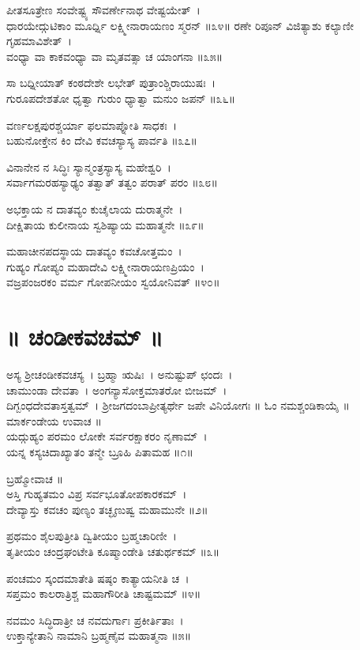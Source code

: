ಪೀತಸೂತ್ರೇಣ ಸಂವೇಷ್ಟ್ಯ ಸೌವರ್ಣೇನಾಥ ವೇಷ್ಟಯೇತ್~।\\
ಧಾರಯೇದ್ಗುಟಿಕಾಂ ಮೂರ್ಧ್ನಿ ಲಕ್ಷ್ಮೀನಾರಾಯಣಂ ಸ್ಮರನ್ ॥೩೪॥
\newpage
ರಣೇ ರಿಪೂನ್ ವಿಜಿತ್ಯಾಶು ಕಲ್ಯಾಣೀ ಗೃಹಮಾವಿಶೇತ್~।\\
ವಂಧ್ಯಾ ವಾ ಕಾಕವಂಧ್ಯಾ ವಾ ಮೃತವತ್ಸಾ ಚ ಯಾಂಗನಾ ॥೩೫॥

ಸಾ ಬಧ್ನೀಯಾತ್ ಕಂಠದೇಶೇ ಲಭೇತ್ ಪುತ್ರಾಂಶ್ಚಿರಾಯುಷಃ~।\\
ಗುರೂಪದೇಶತೋ ಧೃತ್ವಾ ಗುರುಂ ಧ್ಯಾತ್ವಾ ಮನುಂ ಜಪನ್ ॥೩೬॥

ವರ್ಣಲಕ್ಷಪುರಶ್ಚರ್ಯಾ ಫಲಮಾಪ್ನೋತಿ ಸಾಧಕಃ~।\\
ಬಹುನೋಕ್ತೇನ ಕಿಂ ದೇವಿ ಕವಚಸ್ಯಾಸ್ಯ ಪಾರ್ವತಿ ॥೩೭॥

ವಿನಾನೇನ ನ ಸಿದ್ಧಿಃ ಸ್ಯಾನ್ಮಂತ್ರಸ್ಯಾಸ್ಯ ಮಹೇಶ್ವರಿ~।\\
ಸರ್ವಾಗಮರಹಸ್ಯಾಢ್ಯಂ ತತ್ವಾತ್ ತತ್ವಂ ಪರಾತ್ ಪರಂ ॥೩೮॥

ಅಭಕ್ತಾಯ ನ ದಾತವ್ಯಂ ಕುಚೈಲಾಯ ದುರಾತ್ಮನೇ~।\\
ದೀಕ್ಷಿತಾಯ ಕುಲೀನಾಯ ಸ್ವಶಿಷ್ಯಾಯ ಮಹಾತ್ಮನೇ ॥೩೯॥

ಮಹಾಚೀನಪದಸ್ಥಾಯ ದಾತವ್ಯಂ ಕವಚೋತ್ತಮಂ~।\\
ಗುಹ್ಯಂ ಗೋಪ್ಯಂ ಮಹಾದೇವಿ ಲಕ್ಷ್ಮೀನಾರಾಯಣಪ್ರಿಯಂ~।\\
ವಜ್ರಪಂಜರಕಂ ವರ್ಮ ಗೋಪನೀಯಂ ಸ್ವಯೋನಿವತ್ ॥೪೦॥
\section{॥ ಚಂಡೀಕವಚಮ್ ॥}
ಅಸ್ಯ ಶ್ರೀಚಂಡೀಕವಚಸ್ಯ~। ಬ್ರಹ್ಮಾ ಋಷಿಃ~। ಅನುಷ್ಟುಪ್ ಛಂದಃ~।\\ ಚಾಮುಂಡಾ ದೇವತಾ~। ಅಂಗನ್ಯಾಸೋಕ್ತಮಾತರೋ ಬೀಜಮ್~।\\ದಿಗ್ಬಂಧದೇವತಾಸ್ತತ್ವಮ್~। ಶ್ರೀಜಗದಂಬಾಪ್ರೀತ್ಯರ್ಥೇ ಜಪೇ ವಿನಿಯೋಗಃ ॥
\newpage
ಓಂ ನಮಶ್ಚಂಡಿಕಾಯೈ ॥ ಮಾರ್ಕಂಡೇಯ ಉವಾಚ ॥\\
ಯದ್ಗುಹ್ಯಂ ಪರಮಂ ಲೋಕೇ ಸರ್ವರಕ್ಷಾಕರಂ ನೃಣಾಮ್~।\\
ಯನ್ನ ಕಸ್ಯಚಿದಾಖ್ಯಾತಂ ತನ್ಮೇ ಬ್ರೂಹಿ ಪಿತಾಮಹ ॥೧॥

ಬ್ರಹ್ಮೋವಾಚ ॥\\
ಅಸ್ತಿ ಗುಹ್ಯತಮಂ ವಿಪ್ರ ಸರ್ವಭೂತೋಪಕಾರಕಮ್~।\\
ದೇವ್ಯಾಸ್ತು ಕವಚಂ ಪುಣ್ಯಂ ತಚ್ಛೃಣುಷ್ವ ಮಹಾಮುನೇ ॥೨॥

ಪ್ರಥಮಂ ಶೈಲಪುತ್ರೀತಿ ದ್ವಿತೀಯಂ ಬ್ರಹ್ಮಚಾರಿಣೀ~।\\
ತೃತೀಯಂ ಚಂದ್ರಘಂಟೇತಿ ಕೂಷ್ಮಾಂಡೇತಿ ಚತುರ್ಥಕಮ್ ॥೩॥

ಪಂಚಮಂ ಸ್ಕಂದಮಾತೇತಿ ಷಷ್ಠಂ ಕಾತ್ಯಾಯನೀತಿ ಚ~।\\
ಸಪ್ತಮಂ ಕಾಲರಾತ್ರಿಶ್ಚ ಮಹಾಗೌರೀತಿ ಚಾಷ್ಟಮಮ್ ॥೪॥

ನವಮಂ ಸಿದ್ಧಿದಾತ್ರೀ ಚ ನವದುರ್ಗಾಃ ಪ್ರಕೀರ್ತಿತಾಃ~।\\
ಉಕ್ತಾನ್ಯೇತಾನಿ ನಾಮಾನಿ ಬ್ರಹ್ಮಣೈವ ಮಹಾತ್ಮನಾ ॥೫॥

